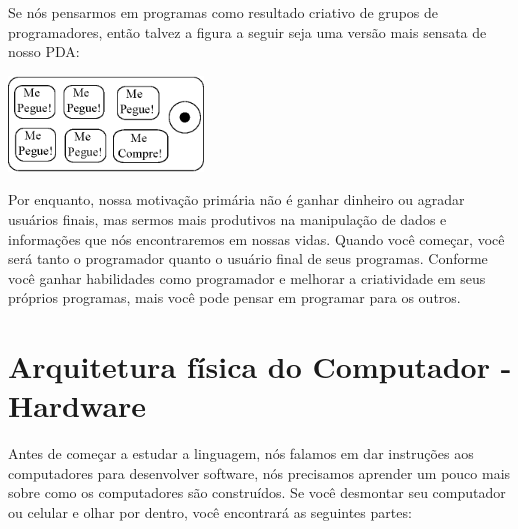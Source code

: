 Se nós pensarmos em programas como resultado criativo de grupos de programadores,
então talvez a figura a seguir seja uma versão mais sensata de nosso PDA:

\beforefig
\centerline{\includegraphics[height=1.00in]{figs2/pda2.eps}}
\afterfig

Por enquanto, nossa motivação primária não é ganhar dinheiro ou agradar usuários finais, mas sermos mais produtivos na manipulação de dados e informações
que nós encontraremos em nossas vidas.
Quando você começar, você será tanto o programador quanto o usuário final de seus
programas. Conforme você ganhar habilidades como programador e melhorar a criatividade
em seus próprios programas, mais você pode pensar em programar para os outros.
%

\section{Arquitetura física do Computador - Hardware}
%

Antes de começar a estudar a linguagem, nós falamos
em dar instruções aos computadores para desenvolver software,
nós precisamos aprender um pouco mais sobre como os computadores
são construídos. Se você desmontar seu computador ou celular e olhar
por dentro, você encontrará as seguintes partes:
%

